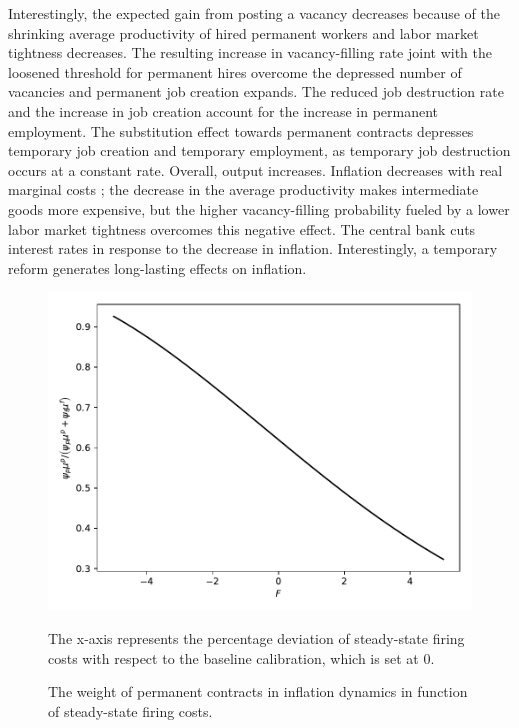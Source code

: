 \documentclass[a4paper]{article}
\begin{document}
Interestingly, the expected gain from posting a vacancy decreases because of the shrinking average productivity of hired permanent workers and labor market tightness decreases. The resulting increase in vacancy-filling rate joint with the loosened threshold for permanent hires overcome the depressed number of vacancies and permanent job creation expands. The reduced job destruction rate and the increase in job creation account for the increase in permanent employment. The substitution effect towards permanent contracts depresses temporary job creation and temporary employment, as temporary job destruction occurs at a constant rate. Overall, output increases. Inflation decreases with real marginal costs ; the decrease in the average productivity makes intermediate goods more expensive, but the higher vacancy-filling probability fueled by a lower labor market tightness overcomes this negative effect. The central bank cuts interest rates in response to the decrease in inflation. Interestingly, a temporary reform generates long-lasting effects on inflation.

\begin{figure}[t]
\includegraphics[scale=1]{NKPC.pdf}
\caption{The weight of permanent contracts in inflation dynamics in function of steady-state firing costs.}
\label{NKPC}
\footnotesize
\begin{flushleft}
The x-axis represents the percentage deviation of steady-state firing costs with respect to the baseline calibration, which is set at 0.
\end{flushleft}
\end{figure}
\end{document}
